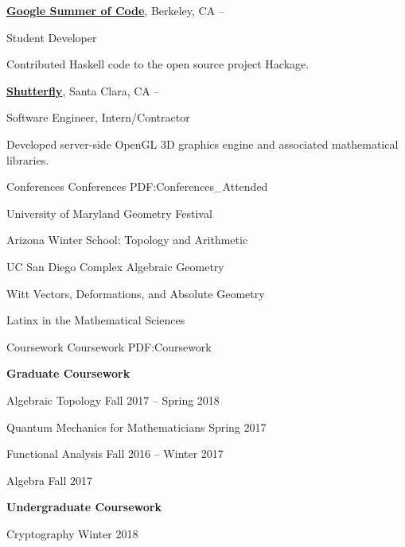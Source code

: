 \documentclass[letterpaper,MMMyyyy,nonstopmode]{simpleresumecv}
\begin{document}
\begin{Body}
\BigGap
\Entry
\href{https://summerofcode.withgoogle.com/archive/}
{\textbf{Google Summer of Code}},
Berkeley, CA
\hfill
{} --

\Gap
\BulletItem
Student Developer

\begin{Detail}
\SubBulletItem
Contributed Haskell code to the open source project Hackage.
\end{Detail}


\BigGap
\Entry
\href{http://www.shutterfly.com/}
{\textbf{Shutterfly}},
Santa Clara, CA
\hfill
{} --

\Gap
\BulletItem
Software Engineer, Intern/Contractor
\begin{Detail}
\SubBulletItem
Developed server-side OpenGL 3D graphics engine and associated mathematical libraries.
\end{Detail}

\Section
{Conferences}
{Conferences}
{PDF:Conferences_Attended}

\BulletItem
University of Maryland Geometry Festival
\hfill {}

\BulletItem
Arizona Winter School: Topology and Arithmetic
\hfill {}


\BulletItem
UC San Diego Complex Algebraic Geometry
\hfill {}

\BulletItem
Witt Vectors, Deformations, and Absolute Geometry
\hfill {}

\BulletItem
Latinx in the Mathematical Sciences
\hfill {}

\Section
{Coursework}
{Coursework}
{PDF:Coursework}

\textbf{Graduate Coursework}

\BulletItem
Algebraic Topology
\hfill Fall 2017 -- Spring 2018

\BulletItem
Quantum Mechanics for Mathematicians
\hfill Spring 2017

\BulletItem
Functional Analysis
\hfill Fall 2016 -- Winter 2017

\BulletItem
Algebra
\hfill Fall 2017
\BigGap

\textbf{Undergraduate Coursework}

\BulletItem
Cryptography
\hfill Winter 2018


\end{Body}
\end{document}
